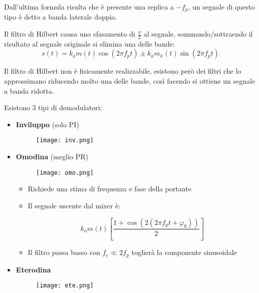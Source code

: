 \documentclass{article}
\begin{document}
\noindent Dall'ultima formula risulta che è presente una replica a $-f_p$, un segnale di questo tipo è detto a banda laterale doppia.\newline

\noindent Il filtro di Hilbert causa uno sfasamento di $\frac{\pi}{2}$ al segnale, sommando/sottraendo il risultato al segnale originale si elimina una delle bande:
$$s(t)=k_am(t)\cos(2\pi f_pt)\pm k_am_h(t)\sin(2\pi f_pt)$$\newline

\noindent Il filtro di Hilbert non è fisicamente realizzabile, esistono però dei filtri che lo approssimano riducendo molto una delle bande, così facendo si ottiene un segnale a banda ridotta.

\newpage

\noindent Esistono 3 tipi di demodulatori:
\begin{itemize}
    \item \textbf{Inviluppo} (solo PI)

    \begin{figure}[ht]
        \centering
        \texttt{[image: inv.png]}
    \end{figure}
    
    \item \textbf{Omodina} (meglio PR)

    \begin{figure}[ht]
        \centering
        \texttt{[image: omo.png]}
    \end{figure}

    \begin{itemize}
        \item Richiede una stima di frequenza e fase della portante
        \item Il segnale uscente dal mixer è:

        $$k_am(t)\left[\frac{1+\cos(2(2\pi f_pt+\varphi_0))}{2}\right]$$

        \item Il filtro passa basso con $f_c\ll 2f_p$ toglierà la componente sinusoidale
        
    \end{itemize}
    
    \item \textbf{Eterodina}

    \begin{figure}[ht]
        \centering
        \texttt{[image: ete.png]}
    \end{figure}


\end{itemize}
\end{document}
